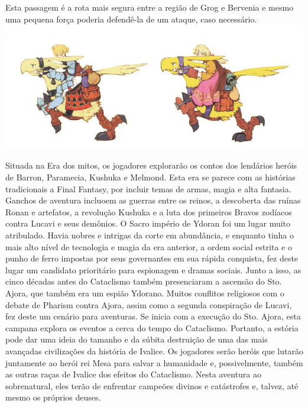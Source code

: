 Esta passagem é a rota mais segura entre a região de Grog e Bervenia e mesmo uma pequena força poderia defendê-la de um ataque, caso necessário.
%
%
\clearpage
%
%
\onecolumn
%
\includegraphics[width=\textwidth]{./art/worldbook/chocobos.jpg}
%
\vfill
%
\begin{multicols}{2}
%
Situada na Era dos mitos, os jogadores explorarão os contos dos lendários heróis de Barron, Paramecia, Kushuka e Melmond. Esta era se parece com as histórias tradicionais a Final Fantasy, por incluir temas de armas, magia e alta fantasia.
Ganchos de aventura incluoem as guerras entre os reinos, a descoberta das ruínas Ronan e artefatos, a revolução Kushuka e a luta dos primeiros Bravos zodíacos contra Lucavi e seus demônios.
%
\ofpar
%
O Sacro império de Ydoran foi um lugar muito atribulado. Havia nobres e intrigas da corte em abundância, e enquanto tinha o mais alto nível de tecnologia e magia da era anterior, a ordem social estrita e o punho de ferro impostas por seus governantes em sua rápida conquista, fez deste lugar um candidato prioritário para espionagem e dramas sociais.
Junto a isso, as cinco décadas antes do Cataclismo também presenciaram a ascensão do Sto. Ajora, que também era um espião Ydorano.
Muitos conflitos religiosos com o debate de Pharism contra Ajora, assim como a segunda conspiração de Lucavi, fez deste um cenário para aventuras.
%
\ofpar
%
Se inicia com a execução do Sto. Ajora, esta campana explora os eventos a cerca do tempo do Cataclismo.
Portanto, a estória pode dar uma ideia do tamanho e da súbita destruição de uma das mais avançadas civilizações da história de Ivalice.
Os jogadores serão heróis que lutarão juntamente ao herói rei Mesa para salvar a humanidade e, possivelmente, também as outras raças de Ivalice dos efeitos do Cataclismo.
Nesta aventura ao sobrenatural, eles terão de enfrentar campeões divinos e catástrofes e, talvez, até mesmo os próprios deuses.\\

\end{multicols}
